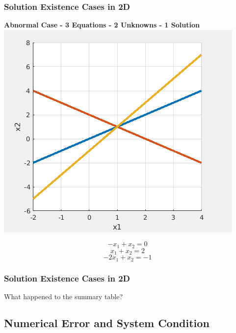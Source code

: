 \documentclass[fleqn]{beamer} %
\newcommand{\sectionIIIsubsectionIIItitle}{Solution Existence Cases in 2D}
\newcommand{\sectionIIIsubsectionIVtitle}{Numerical Error and System Condition}
\begin{document}
			\begin{frame}
				\frametitle{\sectionIIIsubsectionIIItitle}
				\bigskip

				{\bf Abnormal Case - 3 Equations - 2 Unknowns - 1 Solution} \\ \vspace{2mm}
				\includegraphics[scale=.3]{images/lecture5_fig5.png} \\
				\begin{fleqn}
				\[-x_1+x_2=0\]
				\[x_1+x_2=2\]
				\[-2x_1+x_2=-1\]
				\end{fleqn}

				\btVFill
			\end{frame}

			\begin{frame}
				\frametitle{\sectionIIIsubsectionIIItitle}
				\bigskip

				What happened to the summary table?

				\btVFill
			\end{frame}


		\subsection{\sectionIIIsubsectionIVtitle}\label{sectionIIIsubsectionIV}
\end{document}
